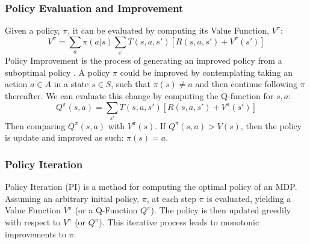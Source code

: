 

\subsubsection{Policy Evaluation and Improvement}
Given a policy, $\pi$, it can be evaluated by computing its Value Function, $V^\pi$:
\begin{equation}
\label{eqn:policyeval}
V^\pi = \sum_a \pi(a|s)\sum_{s'}T(s,a,s')[R(s,a,s') + V^\pi(s')]
\end{equation}
Policy Improvement is the process of generating an improved policy from a suboptimal policy \cite{DBLP:books/lib/Bertsekas05}. A policy $\pi$ could be improved by contemplating taking an action $a \in A$ in a state $s \in S$, such that $\pi(s) \neq a$ and then continue following $\pi$ thereafter. We can evaluate this change by computing the Q-function for $s,a$:
\begin{equation}
\label{eqn:qval}
Q^\pi(s,a) = \sum_{s'}T(s,a,s')[R(s,a,s') + V^\pi(s')]
\end{equation}
Then comparing $Q^\pi(s,a)$ with $V^\pi(s)$. If $Q^\pi(s,a) > V(s)$, then the policy is update and improved as such: $\pi(s) = a$.
\subsubsection{Policy Iteration}
Policy Iteration (PI) \cite{Bellman:1957, howard:dp} is a method for computing the optimal policy of an MDP. Assuming an arbitrary initial policy, $\pi$, at each step $\pi$ is evaluated, yielding a Value Function $V^\pi$ (or a Q-Function $Q^\pi$). The policy is then updated greedily with respect to $V^\pi$ (or $Q^\pi$). This iterative process leads to monotonic improvements to $\pi$.
